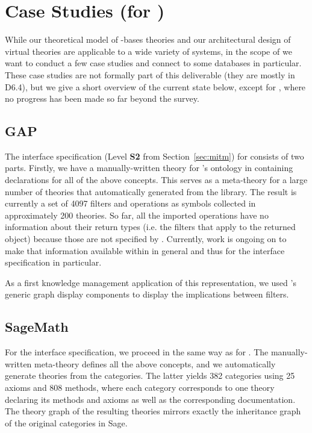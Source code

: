 \section{Case Studies  (for )}\label{sec:cases}

While our theoretical model of \DKS-bases theories and our architectural design of virtual theories are applicable to a wide variety of systems, in the scope of \pn we want to conduct a few case studies and connect to some databases in particular.
These case studies are not formally part of this deliverable (they are mostly in D6.4), but we give a short overview of the current state below, except for \FindStat, where no progress has been made so far beyond the survey.

\subsection{GAP}\label{sec:gap}

The interface specification (Level \textbf{S2} from Section~\ref{sec:mitm}) for \GAP consists of two parts.
Firstly, we have a manually-written theory for \GAP's ontology in \MMT containing declarations for all of the above concepts.
This serves as a meta-theory for a large number of theories that automatically generated from the \GAP library.
The result is currently a set of 4097 filters and operations as \MMT symbols collected in approximately 200 theories.
So far, all the imported operations have no information about their return types (i.e. the filters that apply to the returned object) because those are not specified by \GAP.
Currently, work is ongoing on \GAP to make that information available within \GAP in general and thus for the interface specification in particular.

As a first knowledge management application of this representation, we used \MMT's generic graph display components to display the implications between \GAP filters.

\subsection{SageMath}\label{sec:sage}

For the interface specification, we proceed in the same way as for \GAP.
The manually-written meta-theory defines all the above concepts, and we automatically generate theories from the \SageMath categories.
The latter yields 382 categories using 25 axioms and 808 methods, where each category corresponds to one \MMT theory declaring its methods and axioms as well as the corresponding documentation.
The theory graph of the resulting theories mirrors exactly the inheritance graph of the original categories in Sage.

